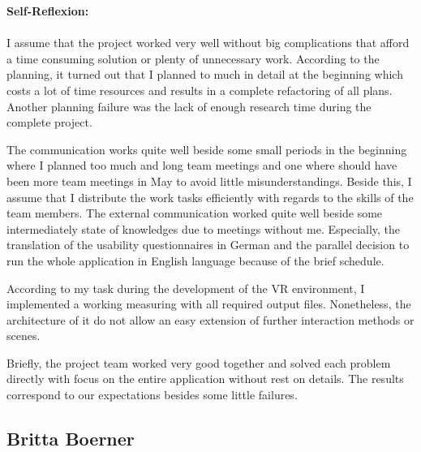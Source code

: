 \textbf{Self-Reflexion:}\\ \\
I assume that the project worked very well without big complications that afford a time consuming solution or plenty of unnecessary work. According to the planning, it turned out that I planned to much in detail at the beginning which costs a lot of time resources and results in a complete refactoring of all plans. Another planning failure was the lack of enough research time during the complete project. 

The communication works quite well beside some small periods in the beginning where I planned too much and long team meetings and one where should have been more team meetings in May to avoid little misunderstandings. Beside this, I assume that I distribute the work tasks efficiently with regards to the skills of the team members. The external communication worked quite well beside some intermediately state of knowledges due to meetings without me. Especially, the translation of the usability questionnaires in German and the parallel decision to run the whole application in English language because of the brief schedule. 

According to my task during the development of the VR environment, I implemented a working measuring with all required output files. Nonetheless, the architecture of it do not allow an easy extension of further interaction methods or scenes. 

Briefly, the project team worked very good together and solved each problem directly with focus on the entire application without rest on details. The results correspond to our expectations besides some little failures.
\subsection{Britta Boerner} \label{sec:SABritta}

